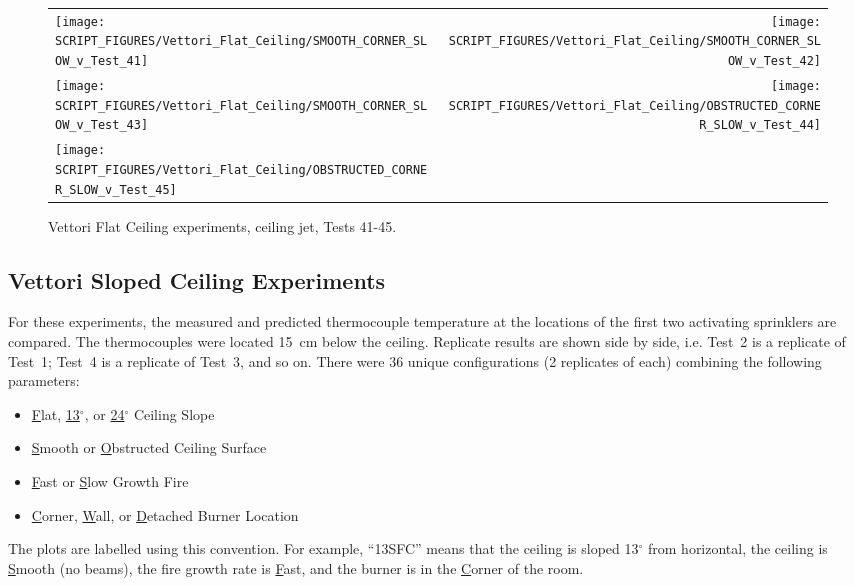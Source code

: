 \begin{figure}[p]
\begin{tabular*}{\textwidth}{l@{\extracolsep{\fill}}r}
\texttt{[image: SCRIPT\_FIGURES/Vettori\_Flat\_Ceiling/SMOOTH\_CORNER\_SLOW\_v\_Test\_41]} &
\texttt{[image: SCRIPT\_FIGURES/Vettori\_Flat\_Ceiling/SMOOTH\_CORNER\_SLOW\_v\_Test\_42]} \\
\texttt{[image: SCRIPT\_FIGURES/Vettori\_Flat\_Ceiling/SMOOTH\_CORNER\_SLOW\_v\_Test\_43]} &
\texttt{[image: SCRIPT\_FIGURES/Vettori\_Flat\_Ceiling/OBSTRUCTED\_CORNER\_SLOW\_v\_Test\_44]} \\
\texttt{[image: SCRIPT\_FIGURES/Vettori\_Flat\_Ceiling/OBSTRUCTED\_CORNER\_SLOW\_v\_Test\_45]} \\
\end{tabular*}
\caption{Vettori Flat Ceiling experiments, ceiling jet, Tests 41-45.}
\label{Vettori_6}
\end{figure}


\clearpage

\subsection{Vettori Sloped Ceiling Experiments}
\label{Vettori_Sloped_Results}

For these experiments, the measured and predicted thermocouple temperature at the locations of the first two activating sprinklers are compared. The thermocouples were located 15~cm below the ceiling. Replicate results are shown side by side, i.e. Test~2 is a replicate of Test~1; Test~4 is a replicate of Test~3, and so on. There were 36 unique configurations (2 replicates of each) combining the following parameters:
\begin{itemize}
\item \underline{F}lat, \underline{13}$^\circ$, or \underline{24}$^\circ$ Ceiling Slope
\item \underline{S}mooth or \underline{O}bstructed Ceiling Surface
\item \underline{F}ast or \underline{S}low Growth Fire
\item \underline{C}orner, \underline{W}all, or \underline{D}etached Burner Location
\end{itemize}
The plots are labelled using this convention. For example, ``13SFC'' means that the ceiling is sloped 13$^\circ$ from horizontal, the ceiling is \underline{S}mooth (no beams), the fire growth rate is \underline{F}ast, and the burner is in the \underline{C}orner of the room.

